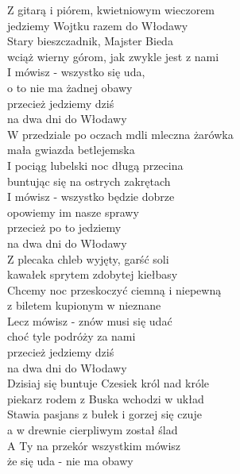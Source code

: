 
\begin{flushleft}
Z gitarą i piórem, kwietniowym wieczorem   \\
jedziemy Wojtku razem do Włodawy   \\
Stary bieszczadnik, Majster Bieda   \\
wciąż wierny górom, jak zwykle jest z nami   \\
I mówisz - wszystko się uda, \tab{} \\
o to nie ma żadnej obawy \tab{}  \\
przecież jedziemy dziś \tab{}  \\
na dwa dni do Włodawy \tab{} \\
\vskip 3mm
W przedziale po oczach mdli mleczna żarówka  \\
mała gwiazda betlejemska  \\
I pociąg lubelski noc długą przecina  \\
buntując się na ostrych zakrętach  \\
I mówisz - wszystko będzie dobrze  \\
opowiemy im nasze sprawy  \\
przecież po to jedziemy  \\
na dwa dni do Włodawy  \\
\vskip 3mm
Z plecaka chleb wyjęty, garść soli  \\
kawałek sprytem zdobytej kiełbasy  \\
Chcemy noc przeskoczyć ciemną i niepewną \\
z biletem kupionym w nieznane  \\
Lecz mówisz - znów musi się udać  \\
choć tyle podróży za nami  \\
przecież jedziemy dziś  \\
na dwa dni do Włodawy  \\
\vskip 3mm
Dzisiaj się buntuje Czesiek król nad króle  \\
piekarz rodem z Buska wchodzi w układ  \\
Stawia pasjans z bułek i gorzej się czuje  \\
a w drewnie cierpliwym został ślad  \\
A Ty na przekór wszystkim mówisz  \\
że się uda - nie ma obawy  \\

\end{flushleft}
